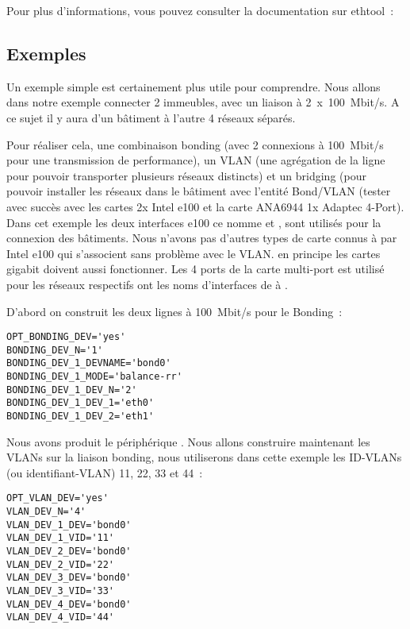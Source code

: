 Pour plus d'informations, vous pouvez consulter la documentation sur ethtool~:

\subsection{Exemples}

Un exemple simple est certainement plus utile pour comprendre. Nous allons dans
notre exemple connecter 2 immeubles, avec un liaison à 2~x~100~Mbit/s. A ce sujet
il y aura d'un bâtiment à l'autre 4 réseaux séparés.

Pour réaliser cela, une combinaison bonding (avec 2 connexions à 100~Mbit/s pour
une transmission de performance), un VLAN (une agrégation de la ligne pour
pouvoir transporter plusieurs réseaux distincts) et un bridging (pour pouvoir
installer les réseaux dans le bâtiment avec l'entité Bond/VLAN (tester avec succès
avec les cartes 2x Intel e100 et la carte ANA6944 1x Adaptec 4-Port). Dans
cet exemple les deux interfaces e100 ce nomme   et , sont
utilisés pour la connexion des bâtiments. Nous n'avons pas d'autres types de carte
connus à par Intel e100 qui s'associent sans problème avec le VLAN. en principe
les cartes gigabit doivent aussi fonctionner. Les 4 ports de la carte multi-port
est utilisé pour les réseaux respectifs ont les noms d'interfaces de 
à .

D'abord on construit les deux lignes à 100~Mbit/s pour le Bonding~:

\begin{example}
\begin{verbatim}
OPT_BONDING_DEV='yes'
BONDING_DEV_N='1'
BONDING_DEV_1_DEVNAME='bond0'
BONDING_DEV_1_MODE='balance-rr'
BONDING_DEV_1_DEV_N='2'
BONDING_DEV_1_DEV_1='eth0'
BONDING_DEV_1_DEV_2='eth1'
\end{verbatim}
\end{example}

Nous avons produit le périphérique . Nous allons construire
maintenant les VLANs sur la liaison bonding, nous utiliserons dans cette
exemple les ID-VLANs (ou identifiant-VLAN) 11, 22, 33 et 44~:

\begin{example}
\begin{verbatim}
OPT_VLAN_DEV='yes'
VLAN_DEV_N='4'
VLAN_DEV_1_DEV='bond0'
VLAN_DEV_1_VID='11'
VLAN_DEV_2_DEV='bond0'
VLAN_DEV_2_VID='22'
VLAN_DEV_3_DEV='bond0'
VLAN_DEV_3_VID='33'
VLAN_DEV_4_DEV='bond0'
VLAN_DEV_4_VID='44'
\end{verbatim}
\end{example}

